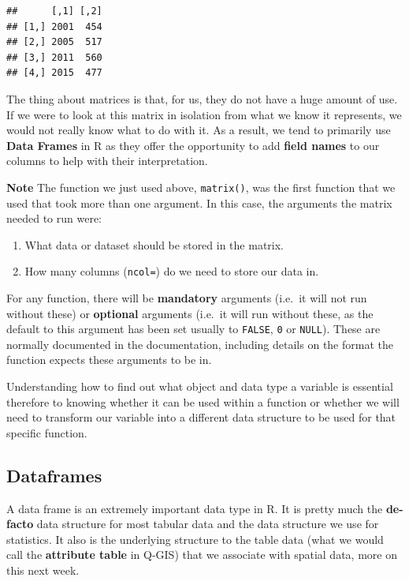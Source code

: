 \documentclass[
]{book}
\providecommand{\tightlist}{%
  \setlength{\itemsep}{0pt}\setlength{\parskip}{0pt}}
\begin{document}
\begin{verbatim}
##      [,1] [,2]
## [1,] 2001  454
## [2,] 2005  517
## [3,] 2011  560
## [4,] 2015  477
\end{verbatim}

The thing about matrices is that, for us, they do not have a huge amount of use. If we were to look at this matrix in isolation from what we know it represents, we would not really know what to do with it. As a result, we tend to primarily use \textbf{Data Frames} in R as they offer the opportunity to add \textbf{field names} to our columns to help with their interpretation.

\textbf{Note}
The function we just used above, \texttt{matrix()}, was the first function that we used that took more than one argument.
In this case, the arguments the matrix needed to run were:

\begin{enumerate}
\def\labelenumi{\arabic{enumi}.}
\tightlist
\item
  What data or dataset should be stored in the matrix.
\item
  How many columns (\texttt{ncol=}) do we need to store our data in.
\end{enumerate}

For any function, there will be \textbf{mandatory} arguments (i.e.~it will not run without these) or \textbf{optional} arguments (i.e.~it will run without these, as the default to this argument has been set usually to \texttt{FALSE}, \texttt{0} or \texttt{NULL}). These are normally documented in the documentation, including details on the format the function expects these arguments to be in.

Understanding how to find out what object and data type a variable is essential therefore to knowing whether it can be used within a function or whether we will need to transform our variable into a different data structure to be used for that specific function.

\hypertarget{dataframes}{%
\subsection{Dataframes}\label{dataframes}}

A data frame is an extremely important data type in R. It is pretty much the \textbf{de-facto} data structure for most tabular data and the data structure we use for statistics. It also is the underlying structure to the table data (what we would call the \textbf{attribute table} in Q-GIS) that we associate with spatial data, more on this next week.
\end{document}
